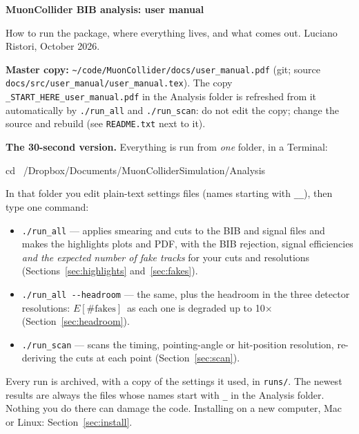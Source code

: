 \documentclass[11pt,letterpaper]{article}
\newcommand{\code}[1]{\texttt{#1}}
\newcommand{\Efakes}{\ensuremath{E[\#\mathrm{fakes}]}}
\begin{document}
{\LARGE\bfseries\color{ink} MuonCollider BIB analysis: user manual}\par
\vspace{2pt}
{\color{muted} How to run the package, where everything lives, and what comes out.
Luciano Ristori, October 2026.}\par
\vspace{4pt}
{\small\color{muted}\textbf{Master copy:} \code{\textasciitilde/code/MuonCollider/docs/user\_manual.pdf}
(git; source \code{docs/src/user\_manual/user\_manual.tex}). The copy
\code{\_START\_HERE\_user\_manual.pdf} in the Analysis folder is refreshed from it
automatically by \code{./run\_all} and \code{./run\_scan}: do not edit the copy;
change the source and rebuild (see \code{README.txt} next to it).}\par
\vspace{6pt}

\begin{keybox}
\textbf{The 30-second version.} Everything is run from \emph{one} folder, in a Terminal:
\begin{shell}
cd ~/Dropbox/Documents/MuonColliderSimulation/Analysis
\end{shell}
In that folder you edit plain-text settings files (names starting with
\code{\_\_}), then type one command:
\begin{itemize}[leftmargin=1.2em]
\item \code{./run\_all} --- applies smearing and cuts to the BIB and signal
  files and makes the highlights plots and PDF, with the BIB rejection,
  signal efficiencies \emph{and the expected number of fake tracks} for your
  cuts and resolutions (Sections~\ref{sec:highlights} and~\ref{sec:fakes}).
\item \code{./run\_all -{}-headroom} --- the same, plus the headroom in the
  three detector resolutions: \Efakes\ as each one is degraded up to
  10$\times$ (Section~\ref{sec:headroom}).
\item \code{./run\_scan} --- scans the timing, pointing-angle or hit-position
  resolution, re-deriving the cuts at each point (Section~\ref{sec:scan}).
\end{itemize}
Every run is archived, with a copy of the settings it used, in \code{runs/}.
The newest results are always the files whose names start with \code{\_}
in the Analysis folder. Nothing you do there can damage the code.
Installing on a new computer, Mac or Linux: Section~\ref{sec:install}.
\end{keybox}
\end{document}
